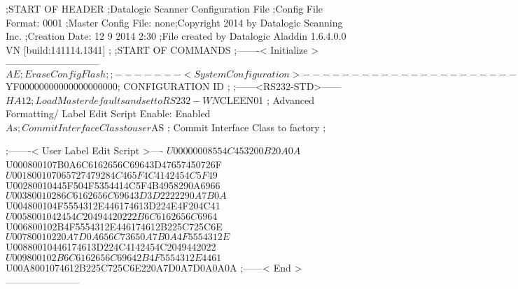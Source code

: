 ;START OF HEADER
;Datalogic Scanner Configuration File
;Config File Format: 0001
;Master Config File: none;Copyright 2014 by Datalogic Scanning Inc.
;Creation Date: 12 9 2014 2:30
;File created by Datalogic Aladdin 1.6.4.0.0 VN [build:141114.1341]
;
;START OF COMMANDS
;-------< Initialize >-----------------------------
$AE                 ; Erase Config Flash
;
;-------< System Configuration >-------------------------------
$YF00000000000000000000; CONFIGURATION ID
;
;------<RS232-STD>------
$HA12               ; Load Master defaults and set to RS232-WN
$CLEEN01            ; Advanced Formatting/ Label Edit Script Enable: Enabled
$As                 ; Commit Interface Class to user
$AS                 ; Commit Interface Class to factory
;

;-------< User Label Edit Script >----
$U00000008554C453200B20A0A
$U000800107B0A6C6162656C69643D47657450726F
$U001800107065727479284C465F4C4142454C5F49
$U00280010445F504F5354414C5F4B4958290A6966
$U00380010286C6162656C69643D3D2222290A7B0A
$U004800104F5554312E446174613D224E4F204C41
$U0058001042454C20494420222B6C6162656C6964
$U006800102B4F5554312E446174612B225C725C6E
$U00780010220A7D0A656C73650A7B0A4F5554312E
$U00880010446174613D224C4142454C2049442022
$U009800102B6C6162656C69642B4F5554312E4461
$U00A8001074612B225C725C6E220A7D0A7D0A0A0A
;------< End >-----------------------
